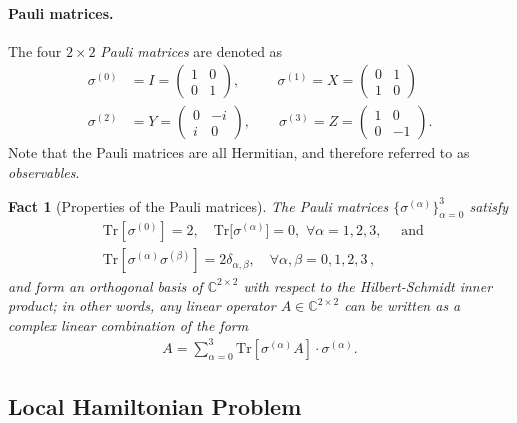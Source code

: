 \documentclass[a4paper,onecolumn,11pt]{quantumarticle}
\theoremstyle{plain}
\newtheorem{fact}[theorem]{Fact}
\begin{document}
\paragraph{Pauli matrices.} The four $2\times 2$ \emph{Pauli matrices} are denoted as
    \begin{align}
        \sigma^{(0)} &= I = \begin{pmatrix} 1 & 0 \\0 & 1 \end{pmatrix}, \quad\quad\,\,\,\,\sigma^{(1)} = X = \begin{pmatrix} 0 & 1 \\ 1 & 0 \end{pmatrix}\\ \sigma^{(2)} &= Y = \begin{pmatrix} 0 & -i \\ i & 0 \end{pmatrix}, \quad\quad \sigma^{(3)} = Z = \begin{pmatrix} 1 & 0 \\ 0 & -1 \end{pmatrix}.
    \end{align}
Note that the Pauli matrices are all Hermitian, and therefore referred to as \emph{observables}.

\begin{fact}[Properties of the Pauli matrices]\label{fact:pauli-properties}
The Pauli matrices $\{\sigma^{(\alpha)}\}_{\alpha =0}^3$ satisfy
  \begin{align}\label{trace-of-product-of-paulis}
&\mathrm{Tr}[\sigma^{(0)}]=2, \quad\mathrm{Tr}\big[\sigma^{(\alpha)}\big]= 0, \,\, \forall\alpha =1,2,3, \quad \text{ and }\\
&\mathrm{Tr}\left[\sigma^{(\alpha)} \sigma^{(\beta)}\right] =  2 \delta_{\alpha,\beta}, \quad \forall \alpha,\beta =0,1,2,3\, ,
    \end{align}
and form an orthogonal basis of $\mathbb{C}^{2 \times 2}$ with respect to the Hilbert-Schmidt inner product; in other words, any linear operator $A \in \mathbb{C}^{2 \times 2}$ can be written as a complex linear combination of the form
\begin{align}
A = \sum_{\alpha=0}^3  \mathrm{Tr}\left[\sigma^{(\alpha)} A\right] \cdot \sigma^{(\alpha)}.
\end{align}
\end{fact}

\subsection{Local Hamiltonian Problem}
\end{document}

